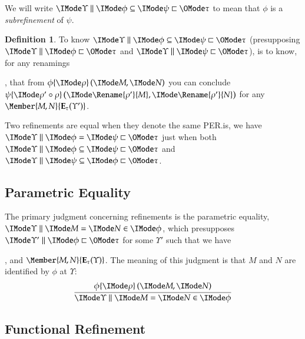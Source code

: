 \documentclass[11pt]{article}
\theoremstyle{definition}
\newtheorem{definition}[thm]{Definition}
\theoremstyle{notation}
\theoremstyle{remark}
\numberwithin{equation}{section}
\newcommand\Exprs{\mathbf{E}}
\begin{document}
We will write $\IsSubrefinement{\Upsilon}{\phi}{\psi}{\tau}$ to mean that $\phi$ is
a \emph{subrefinement} of $\psi$.

\begin{definition}

  To know $\IsSubrefinement{\Upsilon}{\phi}{\psi}{\tau}$ (presupposing
  $\Refines{\Upsilon}{\phi}{\tau}$ and $\Refines{\Upsilon}{\psi}{\tau}$), is
  to know, for any renamings
  , that from $\RefEquate{\phi}{\rho}{M}{N}$ you can conclude
  $\RefEquate{\psi}{\rho'\circ\rho}{\Rename{\rho'}{M}}{\Rename{\rho'}{N}}$ for any
  $\Member{M,N}{\Exprs_\tau(\Upsilon')}$.

\end{definition}

Two refinements are equal when they denote the same PER.\@That is, we have
$\EqRefines{\Upsilon}{\phi}{\psi}{\tau}$ just when both
$\IsSubrefinement{\Upsilon}{\phi}{\psi}{\tau}$ and
$\IsSubrefinement{\Upsilon}{\psi}{\phi}{\tau}$.

\subsection{Parametric Equality}

The primary judgment concerning refinements is the parametric equality,
$\RMemEq{\Upsilon}{M}{N}{\phi}$, which presupposes
$\Refines{\Upsilon'}{\phi}{\tau}$ for some $\Upsilon'$ such that we have
, and $\Member{M,N}{\Exprs_\tau(\Upsilon)}$. The meaning of this judgment is
that $M$ and $N$ are identified by $\phi$ at $\Upsilon$:
\[
  \infer{
    \RMemEq{\Upsilon}{M}{N}{\phi}
  }{
    \RefEquate{\phi}{\rho}{M}{N}
  }
\]

\subsection{Functional Refinement}

\newcommand\RefinesCtxNil{\sqsubset^\star_{\mathtt{nil}}}
\newcommand\RefinesCtxSnoc{\sqsubset^\star_{\mathtt{snoc}}}
\newcommand\PFunRefNil{\vDash^\sqsubset_{\mathtt{nil}}}
\newcommand\PFunRefSnoc{\vDash^\sqsubset_{\mathtt{snoc}}}
\end{document}
